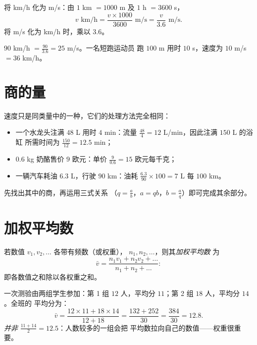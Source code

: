 \begin{method}[速度的换算]\label{met:g8:speed:convert}
将 km/h 化为 m/s：由 $1$ km $= 1000$ m 及 $1$ h $= 3600$ s，
\[
v \text{ km/h} = \frac{v \times 1000}{3600} \text{ m/s}
= \frac{v}{3.6} \text{ m/s}.
\]
将 m/s 化为 km/h 时，乘以 $3.6$。
\end{method}

\begin{example}\label{ex:g8:speed:convert}
$90$ km/h $= \frac{90}{3.6} = 25$ m/s。一名短跑运动员
跑 $100$ m 用时 $10$ s，速度为 $10$ m/s $= 36$ km/h。
\end{example}

\section{商的量}

\begin{example}[流量、密度、每千克价格]\label{ex:g8:speed:quotients}
速度只是同类量中的一种，它们的处理方法完全相同：
\begin{itemize}
  \item 一个水龙头注满 $48$ L 用时 $4$ min：流量
        $\frac{48}{4} = 12$ L/min，因此注满 $150$ L 的浴缸
        所需时间为 $\frac{150}{12} = 12.5$ min；
  \item $0.6$ kg 奶酪售价 $9$ 欧元：单价
        $\frac{9}{0.6} = 15$ 欧元每千克；
  \item 一辆汽车耗油 $6.3$ L，行驶 $90$ km：油耗
        $\frac{6.3}{90} \times 100 = 7$ L 每 $100$ km。
\end{itemize}
先找出其中的商，再运用三式关系
（$q = \frac ab$，$a = qb$，$b = \frac aq$）即可完成其余部分。
\end{example}

\section{加权平均数}

\begin{definition}[加权平均数]\label{def:g8:speed:average}
若数值 $v_1, v_2, \dots$ 各带有频数（或权重），
$n_1, n_2, \dots$，则其\emph{加权平均数}
为
\[
\bar v = \frac{n_1 v_1 + n_2 v_2 + \dots}{n_1 + n_2 + \dots} :
\]
即各数值之和除以各权重之和。
\end{definition}

\begin{example}\label{ex:g8:speed:average}
一次测验由两组学生参加：第 1 组 $12$ 人，平均分
$11$；第 2 组 $18$ 人，平均分 $14$。全班的
平均分为：
\[
\bar v = \frac{12 \times 11 + 18 \times 14}{12 + 18}
= \frac{132 + 252}{30} = \frac{384}{30} = 12.8 .
\]
\emph{并非} $\frac{11 + 14}{2} = 12.5$：人数较多的一组会把
平均数拉向自己的数值——权重很重要。
\end{example}

